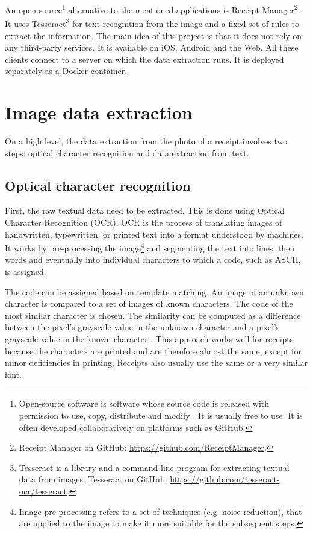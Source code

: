 \documentclass[
  digital, %
  table,   %
  oneside, %
  lof,     %
  lot,     %
]{fithesis3}
\begin{document}
An open-source\footnote{Open-source software is software whose source code is released with permission to use, copy, distribute and modify \cite{GartnerOpenSource}. It is usually free to use. It is often developed collaboratively on platforms such as GitHub.} alternative to the mentioned applications is Receipt Manager\footnote{Receipt Manager on GitHub: \url{https://github.com/ReceiptManager}.}.
It uses Tesseract\footnote{Tesseract is a library and a command line program for extracting textual data from images. Tesseract on GitHub: \url{https://github.com/tesseract-ocr/tesseract}.} for text recognition from the image and a fixed set of rules to extract the information. The main idea of this project is that it does not rely on any third-party services.
It is available on iOS, Android and the Web. All these clients connect to a server on which the data extraction runs. It is deployed separately as a Docker container.

\chapter{Image data extraction}
On a high level, the data extraction from the photo of a receipt involves two steps: optical character recognition and data extraction from text.

\section{Optical character recognition}
First, the raw textual data need to be extracted. This is done using Optical Character Recognition (OCR). OCR is the process of translating images of handwritten, typewritten, or printed text into a format understood by machines.
It works by pre-processing the image\footnote{Image pre-processing refers to a set of techniques (e.g. noise reduction), that are applied to the image to make it more suitable for the subsequent steps.} and segmenting the text into lines, then words and eventually into individual characters to which a code, such as ASCII, is assigned. \cite{Shreya2019OCRCNN}

The code can be assigned based on template matching. An image of an unknown character is compared to a set of images of known characters. The code of the most similar character is chosen. The similarity can be computed as a difference between the pixel's grayscale value in the unknown character and a pixel's grayscale value in the known character \cite{Ziegaus2016TemplateMatching}.
This approach works well\cite{Ziegaus2016TemplateMatching} for receipts because the characters are printed and are therefore almost the same, except for minor deficiencies in printing. Receipts also usually use the same or a very similar font.
\end{document}
